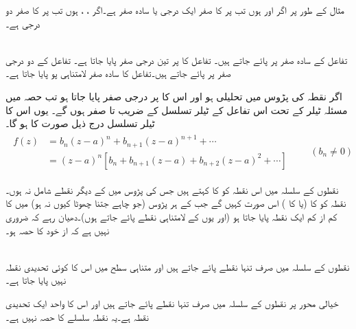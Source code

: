 مثال کے طور پر اگر  اور  ہوں تب  پر  کا صفر ایک درجی  یا سادہ صفر ہے۔اگر ، ،  ہوں تب  پر  کا صفر دو درجی ہے۔ 

\quad {}\\
تفاعل  کے سادہ صفر  پر پائے جاتے ہیں۔ تفاعل  کا  پر تین درجی صفر پایا جاتا ہے۔ تفاعل  کے دو درجی صفر  پر پائے جاتے ہیں۔تفاعل  کا سادہ صفر لامتناہی پو پایا جاتا ہے۔

اگر  نقطہ  کی پڑوس میں تحلیلی ہو اور اس کا  پر  درجی صفر پایا جاتا ہو تب حصہ  میں مسئلہ ٹیلر کے تحت اس تفاعل کے ٹیلر تسلسل کے  ضریب   تا  صفر ہوں گے۔ یوں اس کا ٹیلر تسلسل درج ذیل صورت کا ہو گا۔
\begin{gather}
\begin{aligned}\label{مساوات_ٹیلر_ابتدائی_عددی_سر_صفر_ہیں}
f(z)&=b_n(z-a)^n+b_{n+1}(z-a)^{n+1}+\cdots\\
&=(z-a)^n[b_n+b_{n+1}(z-a)+b_{n+2}(z-a)^2+\cdots]
\end{aligned}
\quad \quad (b_n\ne 0)
\end{gather}

نقطوں کے سلسلہ  میں اس نقطہ کو  کا  کہتے ہیں جس کی پڑوس میں  کے دیگر نقطے شامل نہ ہوں۔نقطہ  کو  کا  (یا  کا ) اس صورت کہیں گے جب  کے ہر پڑوس (جو چاہے جتنا چھوٹا کیوں نہ ہو) میں  کا کم از کم ایک نقطہ   پایا جاتا ہو (اور یوں  کے لامتناہی نقطے پائے جاتے ہوں)۔دھیان رہے کہ ضروری نہیں ہے کہ   از خود  کا حصہ ہو۔ 

\quad {}\\
نقطوں کے سلسلہ  میں صرف تنہا نقطے پائے جاتے ہیں اور متناہی سطح میں اس کا کوئی تحدیدی نقطہ نہیں پایا جاتا ہے۔

خیالی محور پر نقطوں کے سلسلہ  میں صرف تنہا نقطے پائے جاتے ہیں اور اس کا واحد ایک تحدیدی نقطہ  ہے۔یہ نقطہ سلسلے کا حصہ نہیں ہے۔

